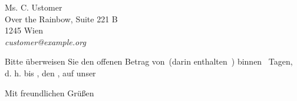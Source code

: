 \documentclass[fontsize=11pt,parskip=half]{scrlttr2}
\begin{document}
\begin{letter}{%
						Ms. C. Ustomer\\
						Over the Rainbow, Suite 221\kern 1pt B\\
						1245 Wien\\[1ex]
						\hfill\emph{customer@example.org}
	}


{\def\par{\relax\ifhmode\unskip\fi\space\ignorespaces} 

		Bitte überweisen Sie den offenen Betrag von\Total\ (darin enthalten\TaxAmnt ~\TaxAbrv) binnen \numberstringnum{\payperiod}~Tagen, d.\kern 1pt h. bis \DayName{\year}{\month}{\day+\payperiod}, den \duedate , auf unser 

		\AdvanceDate[-\payperiod]				%

}	%
\def\amount					{3787,92}		%



\renewcommand*{\raggedsignature}{\raggedright}

		\closing{Mit freundlichen Grüßen}

	\end{letter}
\end{document}
